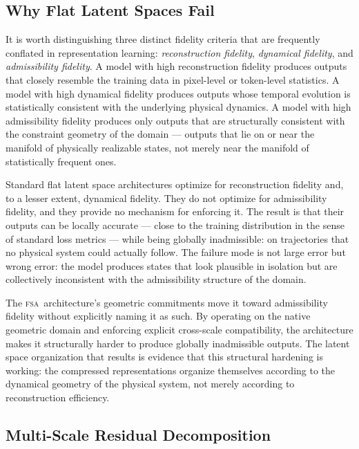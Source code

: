 \documentclass[11pt,a4paper]{article}
\theoremstyle{plain}
\theoremstyle{definition}
\theoremstyle{remark}
\newcommand{\FSA}{\textup{\textsc{fsa}}}
\begin{document}
\subsection{Why Flat Latent Spaces Fail}

It is worth distinguishing three distinct fidelity criteria that are
frequently conflated in representation learning: \textit{reconstruction
fidelity}, \textit{dynamical fidelity}, and \textit{admissibility
fidelity}. A model with high reconstruction fidelity produces outputs that
closely resemble the training data in pixel-level or token-level statistics.
A model with high dynamical fidelity produces outputs whose temporal
evolution is statistically consistent with the underlying physical dynamics.
A model with high admissibility fidelity produces only outputs that are
structurally consistent with the constraint geometry of the domain --- outputs
that lie on or near the manifold of physically realizable states, not merely
near the manifold of statistically frequent ones.

Standard flat latent space architectures optimize for reconstruction fidelity
and, to a lesser extent, dynamical fidelity. They do not optimize for
admissibility fidelity, and they provide no mechanism for enforcing it.
The result is that their outputs can be locally accurate --- close to the
training distribution in the sense of standard loss metrics --- while being
globally inadmissible: on trajectories that no physical system could actually
follow. The failure mode is not large error but wrong error: the model
produces states that look plausible in isolation but are collectively
inconsistent with the admissibility structure of the domain.

The \FSA\ architecture's geometric commitments move it toward admissibility
fidelity without explicitly naming it as such. By operating on the native
geometric domain and enforcing explicit cross-scale compatibility, the
architecture makes it structurally harder to produce globally inadmissible
outputs. The latent space organization that results is evidence that this
structural hardening is working: the compressed representations organize
themselves according to the dynamical geometry of the physical system, not
merely according to reconstruction efficiency.

\subsection{Multi-Scale Residual Decomposition}
\end{document}

